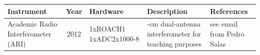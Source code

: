 \documentclass{ws-jai}
\begin{document}
\newcommand{\rr}{\raggedright}
\newcommand{\tn}{\tabularnewline}
\newcommand{\ac}{\centering}
\begin{landscape}
  \centering
  \begin{longtable}{p{3cm} c p{4cm} p{8cm} p{2cm}}
  \label{table:casper-instruments}
  \ac Instrument & \ac Year & \ac Hardware & \ac Description & \ac References \tn
  \hline
  Academic Radio Interferometer (ARI) & 2012 & \rr 1xROACH1 1xADC2x1000-8 & \ac 21-cm dual-antenna interferometer for teaching purposes & see email from Pedro Salas \\

\end{longtable}
\end{landscape}
\end{document}
